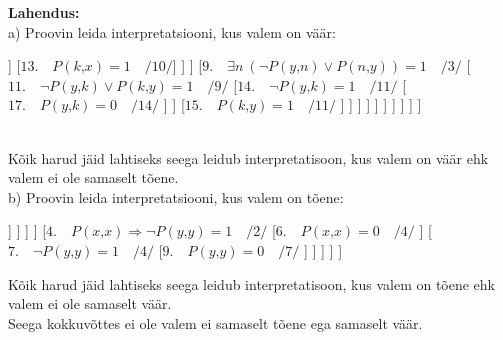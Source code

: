 \documentclass{article}
\begin{document}
\textbf{Lahendus:}\\
a) Proovin leida interpretatsiooni, kus valem on v\"a\"ar:\\
\begin{forest}
	[$1.\quad \forall x\ \exists y\ (\neg P(x\text{,}y)\vee P(y\text{,}x))\Rightarrow(P(x\text{,}x)\Rightarrow\neg P(y\text{,}y))\mathrel{=}0$
	[$2.\quad \forall m\ \exists n\ (\neg P(m\text{,}n)\vee P(n\text{,}m))\Rightarrow(P(x\text{,}x)\Rightarrow\neg P(y\text{,}y))\mathrel{=}0\quad /1/$
		[$3.\quad\forall m\ \exists n\ (\neg P(m\text{,}n)\vee P(n\text{,}m))\mathrel{=}1\quad /2/$
			[$4.\quad P(x\text{,}x)\Rightarrow\neg P(y\text{,}y)\mathrel{=}0\quad /2/$
				[$5.\quad P(x\text{,}x)\mathrel{=}1\quad /4/ $
					[$6.\quad \neg P(y\text{,}y)\mathrel{=}0\quad /4/ $
						[$7.\quad P(y\text{,}y)\mathrel{=}1\quad /6/ $
							[$8.\quad \exists n\ (\neg P(x\text{,}n)\vee P(n\text{,}x))\mathrel{=}1\quad /3/ $
								[$10.\quad \neg P(x\text{,}k)\vee P(k\text{,}x)\mathrel{=}1\quad /8/ $
									[$12.\quad \neg P(x\text{,}k)\mathrel{=}1\quad /10/ $
										[$16.\quad P(x\text{,}k)\mathrel{=}0\quad /12/ $
										]
									]							
									[$13.\quad P(k\text{,}x)\mathrel{=}1\quad /10/ $]
								]
							]
							[$9.\quad \exists n\ (\neg P(y\text{,}n)\vee P(n\text{,}y))\mathrel{=}1\quad /3/ $
								[$11.\quad \neg P(y\text{,}k)\vee P(k\text{,}y)\mathrel{=}1\quad /9/ $
									[$14.\quad \neg P(y\text{,}k)\mathrel{=}1\quad /11/ $
										[$17.\quad P(y\text{,}k)\mathrel{=}0\quad /14/ $
										]
									]
									[$15.\quad P(k\text{,}y)\mathrel{=}1\quad /11/ $
									]
								]
							]
						]
					]
				]
			]
		]
	]
	]
\end{forest}\\
K\~oik harud j\"aid lahtiseks seega leidub interpretatisoon, kus valem on v\"a\"ar ehk valem ei ole samaselt t\~oene.\\
b) Proovin leida interpretatsiooni, kus valem on t\~oene:\\
\begin{forest}
	[$1.\quad \forall x\ \exists y\ (\neg P(x\text{,}y)\vee P(y\text{,}x))\Rightarrow(P(x\text{,}x)\Rightarrow\neg P(y\text{,}y))\mathrel{=}1$
		[$2.\quad \forall m\ \exists n\ (\neg P(m\text{,}n)\vee P(n\text{,}m))\Rightarrow(P(x\text{,}x)\Rightarrow\neg P(y\text{,}y))\mathrel{=}1\quad /1/$
			[$3.\quad\forall m\ \exists n\ (\neg P(m\text{,}n)\vee P(n\text{,}m))\mathrel{=}0\quad /2/$
				[$5.\quad\exists n\ (\neg P(k\text{,}n)\vee P(n\text{,}k))\mathrel{=}0\quad /3/$
					[$8.\quad\forall n\ (P(k\text{,}n)\& \neg P(n\text{,}k))\mathrel{=}1\quad /5/$
						[$10.\quad\forall n\ P(k\text{,}n)\ \&\ \forall n\ \neg P(n\text{,}k)\mathrel{=}1\quad /8/$
							[$11.\quad\forall n\ P(k\text{,}n)\mathrel{=}1\quad /10/$
							]
							[$12.\quad\forall n\ \neg P(n\text{,}k)\mathrel{=}1\quad /10/$
							]
						]
					]
				]
			]
			[$4.\quad P(x\text{,}x)\Rightarrow\neg P(y\text{,}y)\mathrel{=}1\quad /2/$
				[$6.\quad P(x\text{,}x)\mathrel{=}0\quad /4/$
				]
				[$7.\quad \neg P(y\text{,}y)\mathrel{=}1\quad /4/$
					[$9.\quad P(y\text{,}y)\mathrel{=}0\quad /7/$
					]
				]
			]
		]
	]
\end{forest}
K\~oik harud j\"aid lahtiseks seega leidub interpretatisoon, kus valem on t\~oene ehk valem ei ole samaselt v\"a\"ar.\\
Seega kokkuv\~ottes ei ole valem ei samaselt t\~oene ega samaselt v\"a\"ar.
\end{document}
